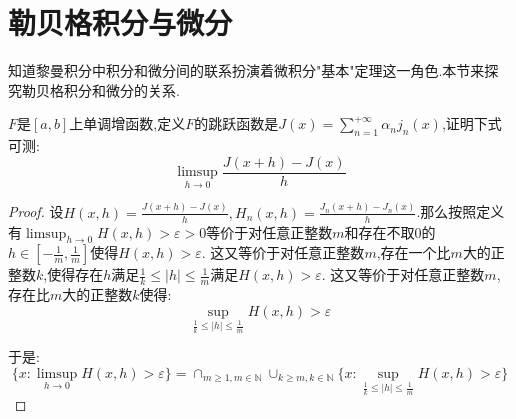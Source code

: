 \section{勒贝格积分与微分}

知道黎曼积分中积分和微分间的联系扮演着微积分"基本"定理这一角色.本节来探究勒贝格积分和微分的关系.

$F$是$[a,b]$上单调增函数,定义$F$的跳跃函数是$J(x)=\sum_ {n=1}^{+\infty}\alpha_nj_n(x)$,证明下式可测:
$$\limsup_{h\to 0}\frac{J(x+h)-J(x)}{h}$$
\begin{proof}

设$H(x,h)=\frac{J(x+h)-J(x)} {h},H_n(x,h)=\frac{J_n(x+h)-J_n(x)}{h}$.那么按照定义有$\limsup_ {h\to0}H(x,h)>\varepsilon>0$等价于对任意正整数$m$和存在不取0的$h\in[-\frac{1}{m},\frac{1}{m}]$使得$H(x,h)>\varepsilon$.
这又等价于对任意正整数$m$,存在一个比$m$大的正整数$k$,使得存在$h$满足$\frac{1}{k}\le |h|\le\frac{1}{m}$满足$H(x,h)>\varepsilon$.
这又等价于对任意正整数$m$,存在比$m$大的正整数$k$使得:
$$\sup_{\frac{1}{k}\le |h|\le\frac{1}{m}}H(x,h)>\varepsilon$$

于是:
$$\{x:\limsup_{h\to0}H(x,h)>\varepsilon\}=\cap_{m\ge1,m\in\mathbb{N}}
\cup_{k\ge m,k\in\mathbb{N}}\{x:\sup_{\frac{1}{k}\le |h|\le\frac{1}{m}}H(x,h)>\varepsilon\}$$



\end{proof}



